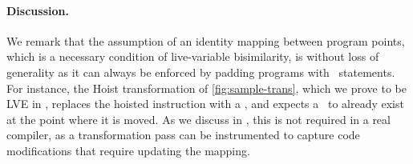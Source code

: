 \paragraph*{Discussion.} We remark that the assumption of an identity mapping between program points, which is a necessary condition of live-variable bisimilarity, is without loss of generality as it can  always be enforced by padding programs with \wskip\ statements. For instance, the Hoist transformation of \myfigure\ref{fig:sample-trans}, which we prove to be LVE in \missing, replaces the hoisted instruction with a \wskip, and expects a \wskip\ to already exist at the point where it is moved. As we discuss in \missing, this is not required in a real compiler, as a transformation pass can be instrumented to capture code modifications that require updating the mapping.